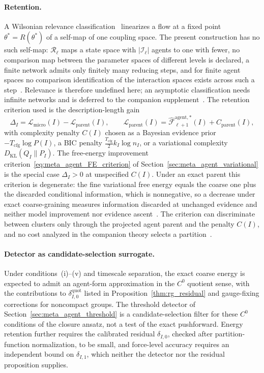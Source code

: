 \paragraph{Retention.}
A Wilsonian relevance classification~\cite{Wilson1971, Wilson1974} linearizes a flow at a fixed point $\theta^*=R(\theta^*)$ of a self-map of one coupling space. The present construction has no such self-map: $\mathcal{R}_\ell$ maps a state space with $|\mathcal{I}_\ell|$ agents to one with fewer, no comparison map between the parameter spaces of different levels is declared, a finite network admits only finitely many reducing steps, and for finite agent spaces no comparison identification of the interaction spaces exists across such a step~\cite[Ch.~11]{DennisGaugeVFE2026}. Relevance is therefore undefined here; an asymptotic classification needs infinite networks and is deferred to the companion supplement~\cite[Chs.~B5 and B6]{DennisGaugeVFESuppB2026}. The retention criterion used is the description-length gain~\cite{Schwarz1978, Rissanen1978}
\begin{equation}
\Delta_I = \mathcal{L}_{\mathrm{micro}}(I) - \mathcal{L}_{\mathrm{parent}}(I), \qquad \mathcal{L}_{\mathrm{parent}}(I) = \widehat{\mathcal{F}}_{\ell+1}^{\mathrm{agent},*}(I) + C_{\mathrm{parent}}(I),
\label{eq:rg_retention_gain}
\end{equation}
with complexity penalty $C(I)$ chosen as a Bayesian evidence prior $-T_{\mathrm{cfg}}\log P(I)$, a BIC penalty $\tfrac{T_{\mathrm{cfg}}}{2} k_I \log n_I$, or a variational complexity $D_{\mathrm{KL}}(Q_I \| P_I)$. The free-energy improvement criterion~\eqref{eq:meta_agent_FE_criterion} of Section~\ref{sec:meta_agent_variational} is the special case $\Delta_I > 0$ at unspecified $C(I)$. Under an exact parent this criterion is degenerate: the fine variational free energy equals the coarse one plus the discarded conditional information, which is nonnegative, so a decrease under exact coarse-graining measures information discarded at unchanged evidence and neither model improvement nor evidence ascent~\cite[Ch.~9]{DennisGaugeVFE2026}. The criterion can discriminate between clusters only through the projected agent parent and the penalty $C(I)$, and no cost analyzed in the companion theory selects a partition~\cite[Ch.~9]{DennisGaugeVFE2026}.

\paragraph{Detector as candidate-selection surrogate.}
Under conditions~(i)--(v) and timescale separation, the exact coarse energy is expected to admit an agent-form approximation in the $C^0$ quotient sense, with the contributions to $\delta_{I,0}^{\mathrm{quot}}$ listed in Proposition~\ref{thm:rg_residual} and gauge-fixing corrections for noncompact groups. The threshold detector of Section~\ref{sec:meta_agent_threshold} is a candidate-selection filter for these $C^0$ conditions of the closure ansatz, not a test of the exact pushforward. Energy retention further requires the calibrated residual $\delta_{I,0}$, checked after partition-function normalization, to be small, and force-level accuracy requires an independent bound on $\delta_{I,1}$, which neither the detector nor the residual proposition supplies.


